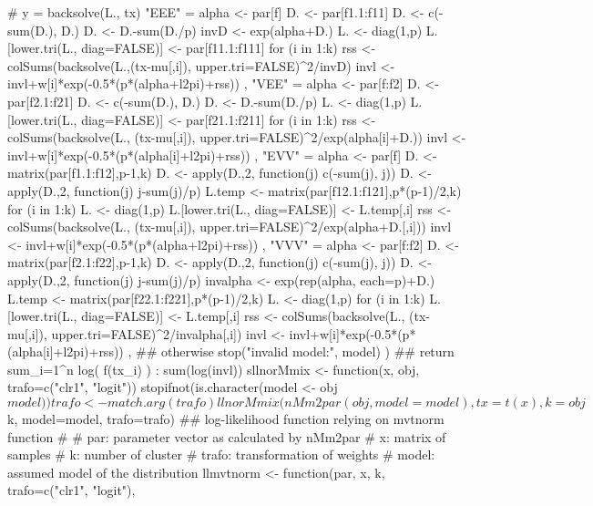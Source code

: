 \begin{Schunk}
\begin{Soutput}
{    # y = backsolve(L., tx)
    "EEE" = {
        alpha <- par[f]
        D. <- par[f1.1:f11]
        D. <- c(-sum(D.), D.)
        D. <- D.-sum(D./p)
        invD <- exp(alpha+D.)
        L. <- diag(1,p)
        L.[lower.tri(L., diag=FALSE)] <- par[f11.1:f111]
        for (i in 1:k) {
            rss <- colSums(backsolve(L.,(tx-mu[,i]), upper.tri=FALSE)^2/invD)
            invl <- invl+w[i]*exp(-0.5*(p*(alpha+l2pi)+rss))
        }
    },
    "VEE" = {
        alpha <- par[f:f2]
        D. <- par[f2.1:f21]
        D. <- c(-sum(D.), D.)
        D. <- D.-sum(D./p)
        L. <- diag(1,p)
        L.[lower.tri(L., diag=FALSE)] <- par[f21.1:f211]
        for (i in 1:k) {
            rss <- colSums(backsolve(L., (tx-mu[,i]), upper.tri=FALSE)^2/exp(alpha[i]+D.))
            invl <- invl+w[i]*exp(-0.5*(p*(alpha[i]+l2pi)+rss))
        }
    },
    "EVV" = {
        alpha <- par[f]
        D. <- matrix(par[f1.1:f12],p-1,k)
        D. <- apply(D.,2, function(j) c(-sum(j), j))
        D. <- apply(D.,2, function(j) j-sum(j)/p)
        L.temp <- matrix(par[f12.1:f121],p*(p-1)/2,k)
        for (i in 1:k) {
            L. <- diag(1,p)
            L.[lower.tri(L., diag=FALSE)] <- L.temp[,i]
            rss <- colSums(backsolve(L., (tx-mu[,i]), upper.tri=FALSE)^2/exp(alpha+D.[,i]))
            invl <- invl+w[i]*exp(-0.5*(p*(alpha+l2pi)+rss))
        }
    },
    "VVV" = {
        alpha <- par[f:f2]
        D. <- matrix(par[f2.1:f22],p-1,k)
        D. <- apply(D.,2, function(j) c(-sum(j), j))
        D. <- apply(D.,2, function(j) j-sum(j)/p)
        invalpha <- exp(rep(alpha, each=p)+D.)
        L.temp <- matrix(par[f22.1:f221],p*(p-1)/2,k)
        L. <- diag(1,p)
        for (i in 1:k) {
            L.[lower.tri(L., diag=FALSE)] <- L.temp[,i]
            rss <- colSums(backsolve(L., (tx-mu[,i]), upper.tri=FALSE)^2/invalpha[,i])
            invl <- invl+w[i]*exp(-0.5*(p*(alpha[i]+l2pi)+rss))
        }
    },
    ## otherwise
    stop("invalid model:", model)
    )
    ## return  sum_{i=1}^n log( f(tx_i) ) :
    sum(log(invl))
}
sllnorMmix <- function(x, obj, trafo=c("clr1", "logit")) {
    stopifnot(is.character(model <- obj$model))
    trafo <- match.arg(trafo)
    llnorMmix(nMm2par(obj, model=model),
              tx = t(x), k = obj$k, model=model, trafo=trafo)
}
## log-likelihood function relying on mvtnorm function
#
# par:   parameter vector as calculated by nMm2par
# x:     matrix of samples
# k:     number of cluster
# trafo: transformation of weights
# model: assumed model of the distribution
llmvtnorm <- function(par, x, k,
                      trafo=c("clr1", "logit"),

\end{Soutput}
\end{Schunk}
